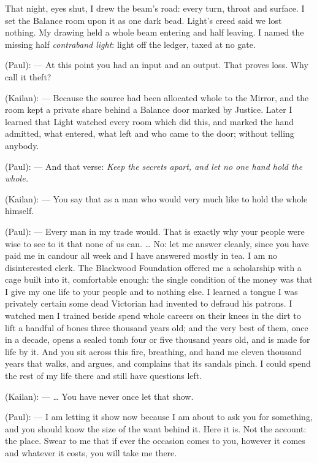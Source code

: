 That night, eyes shut, I drew the beam's road: every turn, throat and surface. I set the Balance room upon it as one dark bead. Light's creed said we lost nothing. My drawing held a whole beam entering and half leaving. I named the missing half \textit{contraband light}: light off the ledger, taxed at no gate.\par

\begin{room}

(Paul): --- At this point you had an input and an output. That proves loss. Why call it theft?

(Kailan): --- Because the source had been allocated whole to the Mirror, and the room kept a private share behind a Balance door marked by Justice. Later I learned that Light watched every room which did this, and marked the hand admitted, what entered, what left and who came to the door; without telling anybody.

(Paul): --- And that verse: \textit{Keep the secrets apart, and let no one hand hold the whole.}

(Kailan): --- You say that as a man who would very much like to hold the whole himself.

(Paul): --- Every man in my trade would. That is exactly why your people were wise to see to it that none of us can. \ldots{} No: let me answer cleanly, since you have paid me in candour all week and I have answered mostly in tea. I am no disinterested clerk. The Blackwood Foundation offered me a scholarship with a cage built into it, comfortable enough: the single condition of the money was that I give my one life to your people and to nothing else. I learned a tongue I was privately certain some dead Victorian had invented to defraud his patrons. I watched men I trained beside spend whole careers on their knees in the dirt to lift a handful of bones three thousand years old; and the very best of them, once in a decade, opens a sealed tomb four or five thousand years old, and is made for life by it. And you sit across this fire, breathing, and hand me eleven thousand years that walks, and argues, and complains that its sandals pinch. I could spend the rest of my life there and still have questions left.

(Kailan): --- \ldots{} You have never once let that show.

(Paul): --- I am letting it show now because I am about to ask you for something, and you should know the size of the want behind it. Here it is. Not the account: the place. Swear to me that if ever the occasion comes to you, however it comes and whatever it costs, you will take me there.


\end{room}

